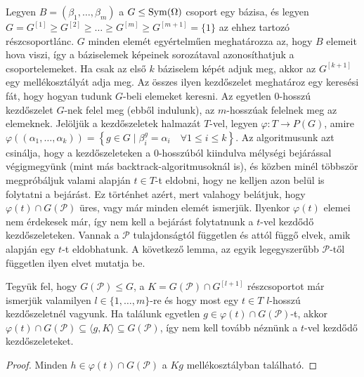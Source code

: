Legyen $B=(\beta_1,\dots,\beta_m)$ a $G \le \operatorname{Sym}(\Omega)$ csoport egy bázisa, és legyen $G = G^{[1]} \ge G^{[2]} \ge \dots \ge G^{[m]} \ge G^{[m+1]} = \{1\}$ az ehhez tartozó részcsoportlánc.
$G$ minden elemét egyértelműen meghatározza az, hogy $B$ elemeit hova viszi, így a báziselemek képeinek sorozátaval azonosíthatjuk a csoportelemeket.
Ha csak az első $k$ báziselem képét adjuk meg, akkor az $G^{[k+1]}$ egy mellékosztályát adja meg.
Az összes ilyen kezdőszelet meghatároz egy keresési fát, hogy hogyan tudunk $G$-beli elemeket keresni.
Az egyetlen $0$-hosszú kezdőszelet $G$-nek felel meg (ebből indulunk), az $m$-hosszúak felelnek meg az elemeknek.
Jelöljük a kezdőszeletek halmazát $T$-vel, legyen $\varphi : T \to P(G)$, amire $\varphi((\alpha_1,\dots,\alpha_k)) = \left\{ g \in G \mid \beta_i^g = \alpha_i \quad \forall 1 \le i \le k \right \}$.
Az algoritmusunk azt csinálja, hogy a kezdőszeleteken a $0$-hosszúból kiindulva mélységi bejárással végigmegyünk (mint más backtrack-algoritmusoknál is),
és közben minél többször megpróbáljuk valami alapján $t \in T$-t eldobni, hogy ne kelljen azon belül is folytatni a bejárást.
Ez történhet azért, mert valahogy belátjuk, hogy $\varphi(t) \cap G(\mathcal{P})$ üres, vagy már minden elemét ismerjük.
Ilyenkor $\varphi(t)$ elemei nem érdekesek már, így nem kell a bejárást folytatnunk a $t$-vel kezdődő kezdőszeleteken.
Vannak a $\mathcal{P}$ tulajdonságtól független és attól függő elvek, amik alapján egy $t$-t eldobhatunk. A következő lemma, az egyik legegyszerűbb $\mathcal{P}$-től független ilyen elvet mutatja be.
\begin{lemma}
Tegyük fel, hogy $G(\mathcal{P}) \le G$, a $K = G(\mathcal{P}) \cap G^{[l+1]}$ részcsoportot már ismerjük valamilyen $l \in \{1,\dots,m\}$-re és hogy most egy $t \in T$ $l$-hosszú kezdőszeletnél vagyunk.
Ha találunk egyetlen $g \in \varphi(t) \cap G(\mathcal{P})$-t, akkor $\varphi(t) \cap G(\mathcal{P}) \subseteq \langle g, K \rangle \subseteq G(\mathcal{P})$, így nem kell tovább néznünk a $t$-vel kezdődő kezdőszeleteket.
\end{lemma}
\begin{proof}
Minden $h \in \varphi(t) \cap G(\mathcal{P})$ a $Kg$ mellékosztályban található.
\end{proof}
